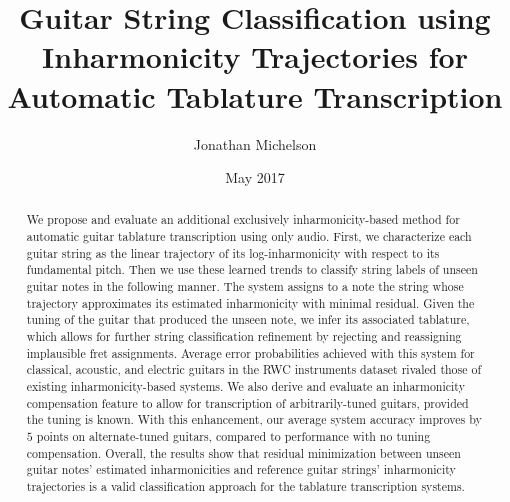 \documentclass[12pt]{cmuthesis}
\begin{document}
 
\frontmatter

\pagestyle{empty}

\title{ %
{\bf Guitar String Classification using Inharmonicity Trajectories for Automatic Tablature Transcription}}
\author{Jonathan Michelson}
\date{May 2017}
\trnumber{}


\support{}
\disclaimer{}



\maketitle


\pagestyle{plain} %


\begin{abstract}
We propose and evaluate an additional exclusively inharmonicity-based method for automatic guitar tablature transcription using only audio. First, we characterize each guitar string as the linear trajectory of its log-inharmonicity with respect to its fundamental pitch. Then we use these learned trends to classify string labels of unseen guitar notes in the following manner. The system assigns to a note the string whose trajectory approximates its estimated inharmonicity with minimal residual. Given the tuning of the guitar that produced the unseen note, we infer its associated tablature, which allows for further string classification refinement by rejecting and reassigning implausible fret assignments. Average error probabilities achieved with this system for classical, acoustic, and electric guitars in the RWC instruments dataset rivaled those of existing inharmonicity-based systems. We also derive and evaluate an inharmonicity compensation feature to allow for transcription of arbitrarily-tuned guitars, provided the tuning is known. With this enhancement, our average system accuracy improves by $5$ points on alternate-tuned guitars, compared to performance with no tuning compensation. Overall, the results show that residual minimization between unseen guitar notes' estimated inharmonicities and reference guitar strings' inharmonicity trajectories is a valid classification approach for the tablature transcription systems.

\end{abstract}
\end{document}
